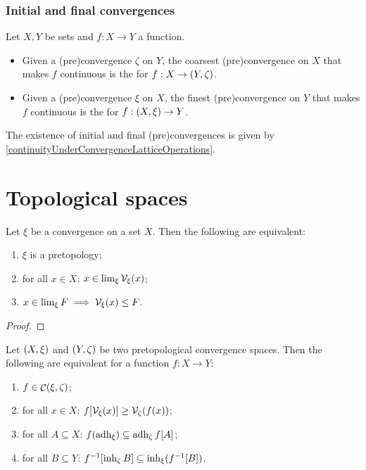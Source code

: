 \subsection{Initial and final convergences}
\begin{proposition}
Let $X, Y$ be sets and $f: X\to Y$ a function.
\begin{itemize}
\item Given a (pre)convergence $\zeta$ on $Y$, the coarsest (pre)convergence on $X$ that makes $f$ continuous is the  for $f: X\to \left( Y,\zeta \right)$.
\item Given a (pre)convergence $\xi$ on $X$, the finest (pre)convergence on $Y$ that makes $f$ continuous is the  for $f: \left( X, \xi \right) \to Y$.
\end{itemize}
\end{proposition}
The existence of initial and final (pre)convergences is given by \ref{continuityUnderConvergenceLatticeOperations}.



\chapter{Topological spaces}

\begin{proposition}
Let $\xi$ be a convergence on a set $X$. Then the following are equivalent:
\begin{enumerate}
\item $\xi$ is a pretopology;
\item for all $x\in X$: $x\in \lim_\xi \mathcal{V}_\xi(x)$;
\item $x\in\lim_\xi F \implies \mathcal{V}_\xi(x) \leq F$.
\end{enumerate}
\end{proposition}
\begin{proof}

\end{proof}

\begin{proposition}
Let $\left( X,\xi \right)$ and $\left( Y,\zeta \right)$ be two pretopological convergence spaces. Then the following are equivalent for a function $f: X\to Y$:
\begin{enumerate}
\item $f\in \mathop{\mathcal{C}}(\xi, \zeta)$;
\item for all $x\in X$: $f[\mathcal{V}_\xi(x)] \geq \mathcal{V}_\zeta(f(x))$;
\item for all $A\subseteq X$: $f(\operatorname{adh}_\xi) \subseteq \operatorname{adh}_\zeta f[A]$;
\item for all $B\subseteq Y$: $f^{-1}[\operatorname{inh}_\zeta B] \subseteq \operatorname{inh}_\xi(f^{-1}[B])$.
\end{enumerate}
\end{proposition}

